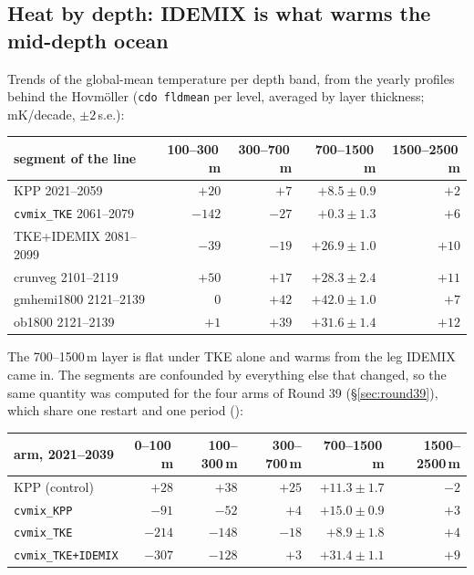 \documentclass[10pt]{article}
\begin{document}
\subsection{Heat by depth: IDEMIX is what warms the mid-depth ocean}\label{sub:r46heat}

Trends of the global-mean temperature per depth band, from the yearly profiles behind the
Hovm\"oller (\texttt{cdo fldmean} per level, averaged by layer thickness; mK/decade, $\pm2$\,s.e.):

\begin{center}\small
\begin{tabular}{lrrrr}
\toprule
segment of the line & 100--300\,m & 300--700\,m & 700--1500\,m & 1500--2500\,m \\
\midrule
KPP 2021--2059              & $+20$  & $+7$  & $+8.5\pm0.9$  & $+2$ \\
\texttt{cvmix\_TKE} 2061--2079 & $-142$ & $-27$ & $+0.3\pm1.3$  & $+6$ \\
TKE+IDEMIX 2081--2099       & $-39$  & $-19$ & $+26.9\pm1.0$ & $+10$ \\
crunveg 2101--2119          & $+50$  & $+17$ & $+28.3\pm2.4$ & $+11$ \\
gmhemi1800 2121--2139       & $0$    & $+42$ & $+42.0\pm1.0$ & $+7$ \\
ob1800 2121--2139           & $+1$   & $+39$ & $+31.6\pm1.4$ & $+12$ \\
\bottomrule
\end{tabular}
\end{center}

\noindent The 700--1500\,m layer is flat under TKE alone and warms from the leg IDEMIX came in.
The segments are confounded by everything else that changed, so the same quantity was computed for
the four arms of Round 39 (\S\ref{sec:round39}), which share one restart and one period
():

\begin{center}\small
\begin{tabular}{lrrrrr}
\toprule
arm, 2021--2039 & 0--100\,m & 100--300\,m & 300--700\,m & 700--1500\,m & 1500--2500\,m \\
\midrule
KPP (control)              & $+28$  & $+38$  & $+25$ & $+11.3\pm1.7$ & $-2$ \\
\texttt{cvmix\_KPP}        & $-91$  & $-52$  & $+4$  & $+15.0\pm0.9$ & $+3$ \\
\texttt{cvmix\_TKE}        & $-214$ & $-148$ & $-18$ & $+8.9\pm1.8$  & $+4$ \\
\texttt{cvmix\_TKE+IDEMIX} & $-307$ & $-128$ & $+3$  & $+31.4\pm1.1$ & $+9$ \\
\bottomrule
\end{tabular}
\end{center}
\end{document}
